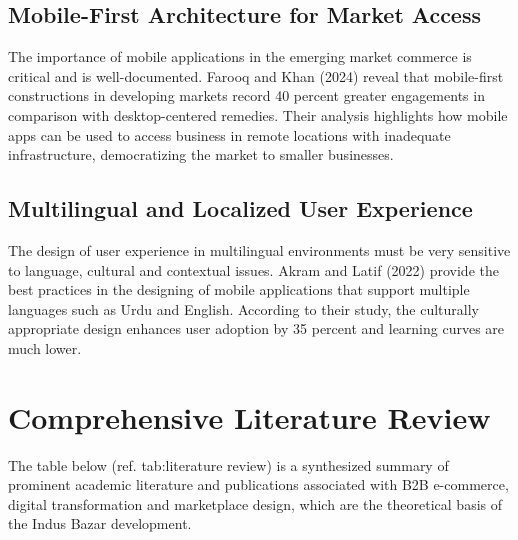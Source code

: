\subsection{Mobile-First Architecture for Market Access}
The importance of mobile applications in the emerging market commerce is critical and is well-documented. Farooq and Khan (2024) \cite{farooq2024mobile} reveal that mobile-first constructions in developing markets record 40 percent greater engagements in comparison with desktop-centered remedies. Their analysis highlights how mobile apps can be used to access business in remote locations with inadequate infrastructure, democratizing the market to smaller businesses.

\subsection{Multilingual and Localized User Experience}
The design of user experience in multilingual environments must be very sensitive to language, cultural and contextual issues. Akram and Latif (2022) \cite{akram2022user} provide the best practices in the designing of mobile applications that support multiple languages such as Urdu and English. According to their study, the culturally appropriate design enhances user adoption by 35 percent and learning curves are much lower.

\section{Comprehensive Literature Review}

The table below (ref. tab:literature review) is a synthesized summary of prominent academic literature and publications associated with B2B e-commerce, digital transformation and marketplace design, which are the theoretical basis of the Indus Bazar development.


